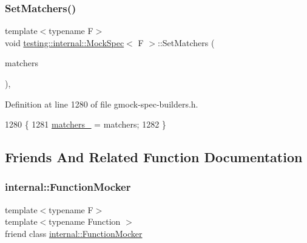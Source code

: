 \subsubsection{\texorpdfstring{Set\+Matchers()}{SetMatchers()}}
{\footnotesize\ttfamily template$<$typename F$>$ \\
void \hyperlink{classtesting_1_1internal_1_1MockSpec}{testing\+::internal\+::\+Mock\+Spec}$<$ F $>$\+::Set\+Matchers (\begin{DoxyParamCaption}\item[{const \hyperlink{classtesting_1_1internal_1_1MockSpec_a35dc5836483cb8c6882c365c447b26cd}{Argument\+Matcher\+Tuple} \&}]{matchers }\end{DoxyParamCaption})\hspace{0.3cm}{\ttfamily [inline]}, {\ttfamily [private]}}



Definition at line 1280 of file gmock-\/spec-\/builders.\+h.


\begin{DoxyCode}
1280                                                          \{
1281     \hyperlink{classtesting_1_1internal_1_1MockSpec_acb32a52e9244cfc33601de0fcc96aa2f}{matchers\_} = matchers;
1282   \}
\end{DoxyCode}


\subsection{Friends And Related Function Documentation}
\mbox{\label{classtesting_1_1internal_1_1MockSpec_a6980863fff8693124aff79c507f87d45}} 
\subsubsection{\texorpdfstring{internal\+::\+Function\+Mocker}{internal::FunctionMocker}}
{\footnotesize\ttfamily template$<$typename F$>$ \\
template$<$typename Function $>$ \\
friend class \hyperlink{classtesting_1_1internal_1_1FunctionMocker}{internal\+::\+Function\+Mocker}\hspace{0.3cm}{\ttfamily [friend]}}



